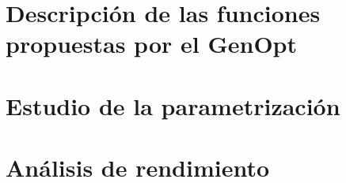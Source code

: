 


\section{Descripción de las funciones propuestas por el GenOpt}
\label{sec:GENOPT}
\section{Estudio de la parametrización}
\label{sec:PARAM}
\section{Análisis de rendimiento}
\label{sec:PERFORMANCE}
